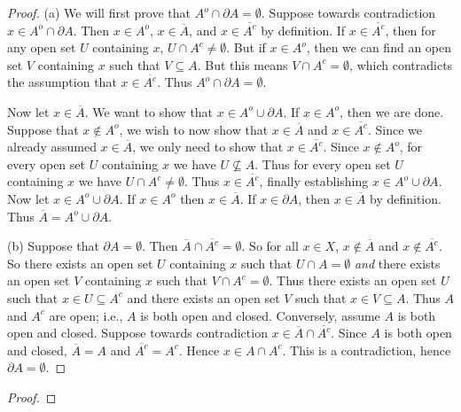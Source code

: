 \documentclass[12pt,twoside,openany]{memoir}
\begin{document}
    \begin{proof}
        (a) We will first prove that $A^o \cap \partial A = \emptyset$. Suppose towards contradiction $x \in A^o \cap \partial A$. Then $x \in A^o$, $x \in \overline{A}$, and $x \in \overline{A^c}$ by definition. If $x \in \overline{A^c}$, then for any open set $U$ containing $x$, $U \cap A^c \neq \emptyset$. But if $x \in A^o$, then we can find an open set $V$ containing $x$ such that $V \subseteq A$. But this means $V \cap A^c = \emptyset$, which contradicts the assumption that $x \in \overline{A^c}$. Thus $A^o \cap \partial A = \emptyset$.
        
        Now let $x \in \overline{A}$. We want to show that $x \in A^o \cup \partial A$. If $x \in A^o$, then we are done. Suppose that $x \not\in A^o$, we wish to now show that $x \in \overline{A}$ and $x \in \overline{A^c}$. Since we already assumed $x \in \overline{A}$, we only need to show that $x \in \overline{A^c}$. Since $x \not\in A^o$, for every open set $U$ containing $x$ we have $U \not\subseteq A$. Thus for every open set $U$ containing $x$ we have $U \cap A^c \neq \emptyset$. Thus $x \in \overline{A^c}$, finally establishing $x \in A^o \cup \partial A$. Now let $x \in A^o \cup \partial A$. If $x \in A^o$ then $x \in \overline{A}$. If $x \in \partial A$, then $x \in \overline{A}$ by definition. Thus $\overline{A} = A^o \cup \partial A$.

        (b) Suppose that $\partial A = \emptyset$. Then $\overline{A} \cap \overline{A^c} = \emptyset$. So for all $x \in X$, $x \not\in \overline{A}$ and $x \not\in \overline{A^c}$. So there exists an open set $U$ containing $x$ such that $U \cap A = \emptyset$ \textit{and} there exists an open set $V$ containing $x$ such that $V \cap A^c = \emptyset$. Thus there exists an open set $U$ such that $x \in U \subseteq A^c$ and there exists an open set $V$ such that $x \in V \subseteq A$. Thus $A$ and $A^c$ are open; i.e., $A$ is both open and closed. Conversely, assume $A$ is both open and closed. Suppose towards contradiction $x \in \overline{A} \cap \overline{A^c}$. Since $A$ is both open and closed, $\overline{A} = A$ and $\overline{A^c} = A^c$. Hence $x \in A \cap A^c$. This is a contradiction, hence $\partial A = \emptyset$.
    \end{proof}
\begin{exercise}[manual-num={20}]
    
\end{exercise}
\begin{proof}

\end{proof}
\end{document}
